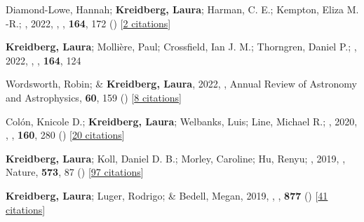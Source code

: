 \item[{\color{numcolor}\scriptsize20}] Diamond-Lowe, Hannah; \textbf{Kreidberg, Laura}; Harman, C. E.; Kempton, Eliza M. -R.; \etal, 2022, , \aj, \textbf{164}, 172 () [\href{https://ui.adsabs.harvard.edu/abs/2022AJ....164..172D}{2 citations}]

\item[{\color{numcolor}\scriptsize19}] \textbf{Kreidberg, Laura}; Molli{\`e}re, Paul; Crossfield, Ian J. M.; Thorngren, Daniel P.; \etal, 2022, , \aj, \textbf{164}, 124

\item[{\color{numcolor}\scriptsize18}] Wordsworth, Robin; \& \textbf{Kreidberg, Laura}, 2022, , Annual Review of Astronomy and Astrophysics, \textbf{60}, 159 () [\href{https://ui.adsabs.harvard.edu/abs/2022ARA&A..60..159W}{8 citations}]

\item[{\color{numcolor}\scriptsize17}] Col{\'o}n, Knicole D.; \textbf{Kreidberg, Laura}; Welbanks, Luis; Line, Michael R.; \etal, 2020, , \aj, \textbf{160}, 280 () [\href{https://ui.adsabs.harvard.edu/abs/2020AJ....160..280C}{20 citations}]

\item[{\color{numcolor}\scriptsize16}] \textbf{Kreidberg, Laura}; Koll, Daniel D. B.; Morley, Caroline; Hu, Renyu; \etal, 2019, , Nature, \textbf{573}, 87 () [\href{https://ui.adsabs.harvard.edu/abs/2019Natur.573...87K}{97 citations}]

\item[{\color{numcolor}\scriptsize15}] \textbf{Kreidberg, Laura}; Luger, Rodrigo; \& Bedell, Megan, 2019, , \apj, \textbf{877} () [\href{https://ui.adsabs.harvard.edu/abs/2019ApJ...877L..15K}{41 citations}]

